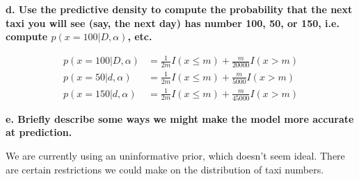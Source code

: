 {\textbf{d. Use the predictive density to compute the probability that the
next taxi you will see (say, the next day) has number 100, 50, or 150, i.e.
compute $p(x = 100|D,\alpha)$, etc.}

\begin{align}
    p(x=100|D,\alpha) & = \frac{1}{2m} I(x\leq m) + \frac{m}{20000} I(x>m) \\
    p(x=50|d,\alpha) & = \frac{1}{2m} I(x \leq m) + \frac{m}{5000} I(x>m) \\
    p(x=150|d,\alpha) & = \frac{1}{2m}I(x \leq m) + \frac{m}{45000} I(x>m)
\end{align}

\textbf{e. Briefly describe some ways we might make the model more accurate
at prediction.}

We are currently using an uninformative prior, which doesn't seem ideal. There
are certain restrictions we could make on the distribution of taxi numbers.

}

